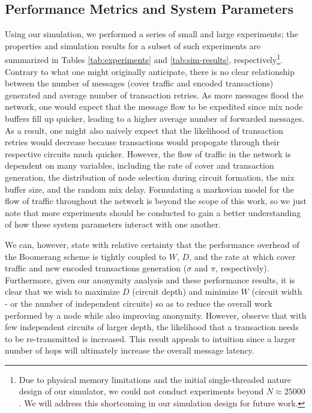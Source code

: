 \subsection{Performance Metrics and System Parameters}
Using our simulation, we performed a series of small and large experiments; the properties and simulation results for a subset of such experiments are summarized in Tables \ref{tab:experiments} and \ref{tab:sim-results}, respectively\footnote{Due to physical memory limitations and the initial single-threaded nature design of our simulator, we could not conduct experiments beyond $N \approx 25000$. We will address this shortcoming in our simulation design for future work.}. Contrary to what one might originally anticipate, there is no clear relationship between the number of messages (cover traffic and encoded transactions) generated and average number of transaction retries. As more messages flood the network, one would expect that the message flow to be expedited since mix node buffers fill up quicker, leading to a higher average number of forwarded messages. As a result, one might also naively expect that the likelihood of transaction retries would decrease because transactions would propogate through their respective circuits much quicker. However, the flow of traffic in the network is dependent on many variables, including the rate of cover and transaction generation, the distribution of node selection during circuit formation, the mix buffer size, and the random mix delay. Formulating a markovian model for the flow of traffic throughout the network is beyond the scope of this work, so we just note that more experiments should be conducted to gain a better understanding of how these system parameters interact with one another. 

We can, however, state with relative certainty that the performance overhead of the Boomerang scheme is tightly coupled to $W$, $D$, and the rate at which cover traffic and new encoded transactions generation ($\sigma$ and $\pi$, respectively). Furthermore, given our anonymity analysis and these performance results, it is clear that we wish to maximize $D$ (circuit depth) and minimize $W$ (circuit width - or the number of independent circuits) so as to reduce the overall work performed by a node while also improving anonymity. However, observe that with few independent circuits of larger depth, the likelihood that a transaction needs to be re-transmitted is increased. This result appeals to intuition since a larger number of hops will ultimately increase the overall message latency.

